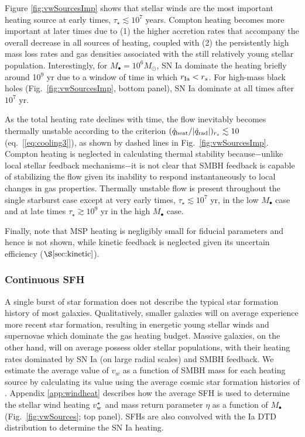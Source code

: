 \documentclass[usenatbib,fleqn]{mn2e}
\newcommand{\rs}{r_s}
\newcommand{\vwO}{v_{w}}
\begin{document}
Figure \ref{fig:vwSourcesImp} shows that stellar winds are the most important heating source at early times, $\tau_{\star} \lesssim 10^{7}$ years.  Compton heating becomes more important at later times due to (1) the higher accretion rates that accompany the overall decrease in all sources of heating, coupled with (2) the persistently high mass loss rates and gas densities associated with the still relatively young stellar population.  Interestingly, for $M_{\bullet} = 10^{6}M_{\odot}$, SN Ia dominate the heating briefly around 10$^{9}$ yr due to a window of time in which $r_{\rm Ia} < \rs$.  For high-mass black holes (Fig.~\ref{fig:vwSourcesImp}, bottom panel), SN Ia dominate at all times after $10^{7}$ yr.

As the total heating rate declines with time, the flow inevitably becomes thermally unstable according to the criterion $(\dot{q}_{\rm heat}/|\dot{q}_{\rm rad}|)_{r_{s}} \lesssim 10$
(eq.~[\ref{eq:cooling3}]), as shown by dashed lines in
Fig.~\ref{fig:vwSourcesImp}.  Compton heating is neglected in
calculating thermal stability because$-$unlike local stellar feedback
mechanisms$-$it is not clear that SMBH feedback is capable of stabilizing the
flow given its inability to respond instantaneously to local changes
in gas properties.  Thermally unstable flow is present throughout the single starburst case except at very early times, $\tau_{\star} \lesssim 10^7$ yr, in the low $M_{\bullet}$ case and at late times $\tau_{\star}
\gtrsim 10^{9}$ yr in the high $M_{\bullet}$ case.

Finally, note that MSP heating is negligibly small for fiducial parameters and hence
is not shown, while kinetic feedback is neglected given its uncertain efficiency ($\S\ref{sec:kinetic}$).

\subsubsection{Continuous SFH}
A single burst of star formation does not describe the typical star
formation history of most galaxies.  Qualitatively, smaller galaxies
will on average experience more recent star formation, resulting in
energetic young stellar winds and supernovae which dominate the gas
heating budget.  Massive galaxies, on the other hand, will on average
possess older stellar populations, with their heating rates dominated
by SN Ia (on large radial scales) and SMBH feedback.  We estimate the
average value of $\vwO$ as a function of SMBH mass for each heating
source by calculating its value using the average cosmic star
formation histories of \citet{MosterNaab+:2013a}.  Appendix
\ref{app:windheat} describes how the average SFH is
used to determine the stellar wind heating $v_{\rm w}^{\star}$ and
mass return parameter $\eta$ as a function of $M_{\bullet}$
(Fig.~\ref{fig:vwSources}; top panel).  SFHs are also
convolved with the Ia DTD distribution to determine the SN Ia heating.
\end{document}

